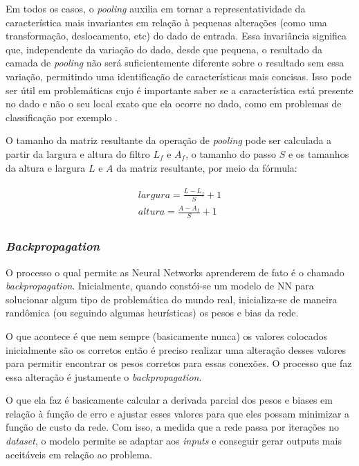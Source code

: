 Em todos os casos, o \textit{pooling} auxilia em tornar a representatividade da característica mais invariantes em relação à pequenas alterações (como uma transformação, deslocamento, etc) do dado de entrada. Essa invariância significa que, independente da variação do dado, desde que pequena, o resultado da camada de \textit{pooling} não será suficientemente diferente sobre o resultado sem essa variação, permitindo uma identificação de características mais concisas. Isso pode ser útil em problemáticas cujo é importante saber se a característica está presente no dado e não o seu local exato que ela ocorre no dado, como em problemas de classificação por exemplo \cite{goodfellow-et-al-2016}.

O tamanho da matriz resultante da operação de \textit{pooling} pode ser calculada a partir da largura e altura do filtro \(L_f\) e \(A_f\), o tamanho do passo \(S\) e os tamanhos da altura e largura \(L\) e \(A\) da matriz resultante, por meio da fórmula:

\begin{gather}
  \begin{split}
    largura = \frac{L - L_f}{S}  + 1 \\
    altura =  \frac{A - A_f}{S} + 1
  \end{split}
  \label{math:size-after-pooling}
\end{gather}


\subsubsection{\textit{Backpropagation}} \label{sssec:backpropagation}

O processo o qual permite as Neural Networks aprenderem de fato é o chamado \textit{backpropagation}. Inicialmente, quando constói-se um modelo de NN para solucionar algum tipo de problemática do mundo real, inicializa-se de maneira randômica (ou seguindo algumas heurísticas) os pesos e bias da rede.

O que acontece é que nem sempre (basicamente nunca) os valores colocados inicialmente são os corretos então é preciso realizar uma alteração desses valores para permitir encontrar os pesos corretos para essas conexões. O processo que faz essa alteração é justamente o \textit{backpropagation}.

O que ela faz é basicamente calcular a derivada parcial dos pesos e biases em relação à função de erro e ajustar esses valores para que eles possam minimizar a função de custo da rede. Com isso, a medida que a rede passa por iterações no \textit{dataset}, o modelo permite se adaptar aos \textit{inputs} e conseguir gerar outputs mais aceitáveis em relação ao problema.


